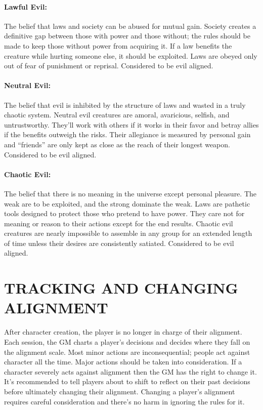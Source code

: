 \begin{multicols}{2}
\paragraph{Lawful Evil:} The belief that laws and society can be abused for mutual gain.  Society creates a definitive gap between those with power and those without; the rules should be made to keep those without power from acquiring it.  If a law benefits the creature while hurting someone else, it should be exploited.  Laws are obeyed only out of fear of punishment or reprisal.  Considered to be evil aligned.
 
\paragraph{Neutral Evil:}  The belief that evil is inhibited by the structure of laws and wasted in a truly chaotic system.  Neutral evil creatures are amoral, avaricious, selfish, and untrustworthy.  They'll work with others if it works in their favor and betray allies if the benefits outweigh the risks.  Their allegiance is measured by personal gain and ``friends'' are only kept as close as the reach of their longest weapon.  Considered to be evil aligned.

\paragraph{Chaotic Evil:} The belief that there is no meaning in the universe except personal pleasure.  The weak are to be exploited, and the strong dominate the weak.  Laws are pathetic tools designed to protect those who pretend to have power.  They care not for meaning or reason to their actions except for the end results.  Chaotic evil creatures are nearly impossible to assemble in any group for an extended length of time unless their desires are consistently satiated.  Considered to be evil aligned.

\section{TRACKING AND CHANGING ALIGNMENT}

After character creation, the player is no longer in charge of their alignment.  Each session, the GM charts a player's decisions and decides where they fall on the alignment scale.  Most minor actions are inconsequential; people act against character all the time.  Major actions should be taken into consideration.  If a character severely acts against alignment then the GM has the right to change it.  It's recommended to tell players about to shift to reflect on their past decisions before ultimately changing their alignment.  Changing a player's alignment requires careful consideration and there's no harm in ignoring the rules for it.


\end{multicols}

